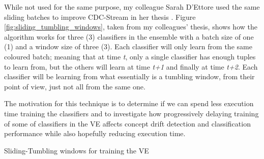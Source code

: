 While not used for the same purpose, my colleague Sarah D'Ettore used the same sliding batches to improve CDC-Stream in her thesis \citep{d2016fine}. Figure \ref{fig:sliding_tumbling_windows}, taken from my colleagues' thesis, shows how the algorithm works for three (3) classifiers in the ensemble with a batch size of one (1) and a window size of three (3). Each classifier will only learn from the same coloured batch; meaning that at time \textit{t}, only a single classifier has enough tuples to learn from, but the others will learn at time \textit{t+1} and finally at time \textit{t+2}. Each classifier will be learning from what essentially is a tumbling window, from their point of view, just not all from the same one.

The motivation for this technique is to determine if we can spend less execution time training the classifiers and to investigate how progressively delaying training of some of classifiers in the VE affects concept drift detection and classification performance while also hopefully reducing execution time.

\begin{algorithm}
\caption{Sliding-Tumbling windows for training the VE\label{alg:sliding_tumbling_windows}}
\end{algorithm}

